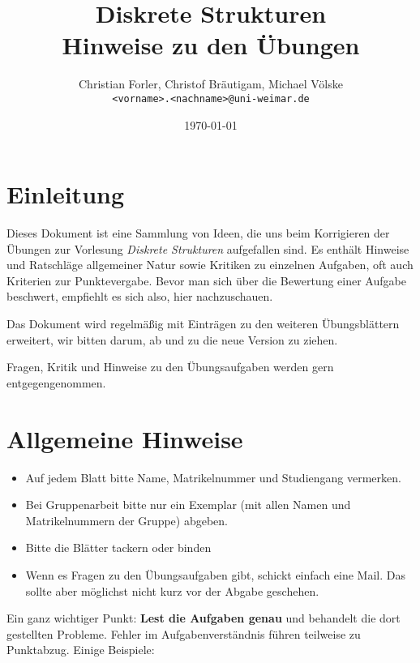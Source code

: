 \documentclass[%
	final, %
	normalheadings, %
	ngerman, %
	a4paper,
	1.1headlines, %
	pagesize, %
	halfparskip, %
	pointlessnumbers, %
	fleqn, %
]{scrartcl} %
\begin{document}
\title{Diskrete Strukturen\\
       Hinweise zu den Übungen}
\author{Christian Forler, Christof Bräutigam, Michael Völske\\
    \texttt{<vorname>.<nachname>@uni-weimar.de}}
\date{\today}
\maketitle

\section{Einleitung}

Dieses Dokument ist eine Sammlung von Ideen, die uns beim Korrigieren der
Übungen zur Vorlesung \textit{Diskrete Strukturen} aufgefallen sind. Es
enthält Hinweise und Ratschläge allgemeiner Natur sowie Kritiken zu einzelnen
Aufgaben, oft auch Kriterien zur Punktevergabe. Bevor man sich über die
Bewertung einer Aufgabe beschwert, empfiehlt es sich also, hier nachzuschauen.

Das Dokument wird regelmäßig mit Einträgen zu den weiteren Übungsblättern
erweitert, wir bitten darum, ab und zu die neue Version zu ziehen.

Fragen, Kritik und Hinweise zu den Übungsaufgaben werden gern entgegengenommen.

\section{Allgemeine Hinweise}

\begin{itemize}
    \item Auf jedem Blatt bitte Name, Matrikelnummer und Studiengang
          vermerken.
    \item Bei Gruppenarbeit bitte nur ein Exemplar (mit allen Namen und
          Matrikelnummern der Gruppe) abgeben.
    \item Bitte die Blätter tackern oder binden
    \item Wenn es Fragen zu den Übungsaufgaben gibt, schickt einfach eine Mail.
          Das sollte aber möglichst nicht kurz vor der Abgabe geschehen.
\end{itemize}

Ein ganz wichtiger Punkt: \textbf{Lest die Aufgaben genau} und behandelt die
dort gestellten Probleme. Fehler im Aufgabenverständnis führen teilweise zu
Punktabzug. Einige Beispiele:
\end{document}
